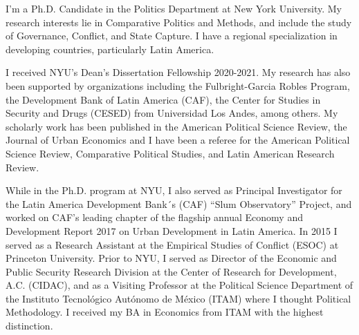 
I’m a Ph.D. Candidate in the Politics Department at New York University. My research interests lie in Comparative Politics and Methods, and include the study of Governance, Conflict, and State Capture. I have a regional specialization in developing countries, particularly Latin America.

I received NYU’s Dean’s Dissertation Fellowship 2020-2021. My research has also been supported by organizations including the Fulbright-Garcia Robles Program, the Development Bank of Latin America (CAF), the Center for Studies in Security and Drugs (CESED) from Universidad Los Andes, among others. My scholarly work has been published in the American Political Science Review, the Journal of Urban Economics and I have been a referee for the American Political Science Review, Comparative Political Studies, and Latin American Research Review.

While in the Ph.D. program at NYU, I also served as Principal Investigator for the Latin America Development Bank´s (CAF) “Slum Observatory” Project, and worked on CAF’s leading chapter of the flagship annual Economy and Development Report 2017 on Urban Development in Latin America. In 2015 I served as a Research Assistant at the Empirical Studies of Conflict (ESOC) at Princeton University. Prior to NYU, I served as Director of the Economic and Public Security Research Division at the Center of Research for Development, A.C. (CIDAC), and as a Visiting Professor at the Political Science Department of the Instituto Tecnológico Autónomo de México (ITAM) where I thought Political Methodology. I received my BA in Economics from ITAM with the highest distinction. 
